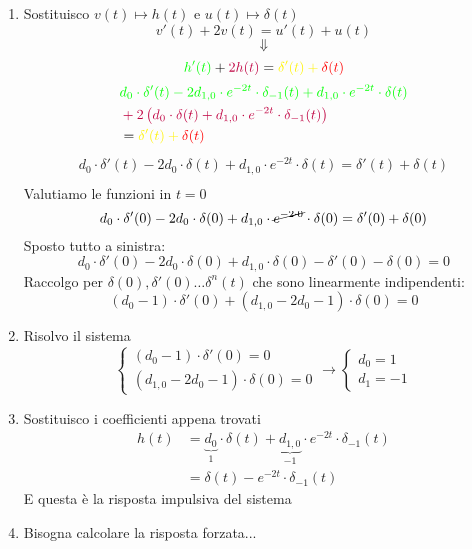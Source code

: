\documentclass[a4paper]{article}
\begin{document}
\begin{example}
\begin{enumerate}
    \item Sostituisco \( v(t) \mapsto h(t) \) e \( u(t) \mapsto \delta(t) \) 
      \[
      v'(t) + 2v(t) = u'(t) + u(t)
      \] 
      \[
      \Downarrow
      \] 
      \[
        \color{green}h'(t) \color{black}+ \color{purple}2h(t) \color{black}= 
        \color{yellow}\delta'(t) + \color{red}\delta(t)
      \] 
      \[
        \begin{aligned}
          &\color{green}d_0 \cdot \delta'(t) - 2d_{1,0} \cdot e^{-2t} \cdot \delta_{-1}(t) + d_{1,0}
          \cdot e^{-2t} \cdot \delta(t) \\
          &\color{purple}+ 2 \left( d_0 \cdot \delta(t) + d_{1,0} \cdot
          e^{-2t} \cdot \delta_{-1}(t) \right)\\
          &= \color{yellow}\delta'(t) + \color{red}\delta(t)
        \end{aligned}
      \] 
      \[
      \begin{aligned}
        d_0 \cdot \delta'(t) - 2d_0 \cdot  \delta(t) + d_{1,0} \cdot e^{-2t} \cdot
        \delta(t) = \delta'(t) + \delta(t)\\
      \end{aligned}
      \] 
      Valutiamo le funzioni in \( t=0 \) 
      \[
        d_0 \cdot \delta'(0) - 2d_0 \cdot  \delta(0) + d_{1,0} \cdot \cancel{e^{-2 \cdot 0}}
        \cdot \delta(0) = \delta'(0) + \delta(0)
      \] 
      Sposto tutto a sinistra:
      \[
        d_0 \cdot \delta'(0) - 2d_0 \cdot \delta(0) + d_{1,0} \cdot \delta(0) - \delta'(0) -
        \delta(0) = 0
      \] 
      Raccolgo per \( \delta(0), \delta'(0)\ldots \delta^n(t) \) che sono linearmente
      indipendenti:
      \[
        \left( d_0 - 1 \right) \cdot \delta'(0) + \left( d_{1,0} - 2d_0 - 1 \right) \cdot
        \delta(0) = 0
      \] 

    \item Risolvo il sistema
      \[
      \begin{cases}
        \left( d_0 - 1 \right) \cdot \delta'(0) = 0\\
        \left( d_{1,0} - 2d_0 - 1 \right) \cdot \delta(0) = 0
      \end{cases}
      \to 
      \begin{cases}
        d_0 = 1\\
        d_1 = -1
      \end{cases}
      \] 

    \item Sostituisco i coefficienti appena trovati
      \[
        \begin{aligned}
          h(t) &= \underbrace{d_0}_{1} \cdot \delta(t) + \underbrace{d_{1,0}}_{-1}
          \cdot e^{-2t} \cdot \delta_{-1}(t)\\
               &= \delta(t) - e^{-2t} \cdot \delta_{-1}(t)
        \end{aligned}
      \] 
      E questa è la risposta impulsiva del sistema

    \item Bisogna calcolare la risposta forzata...
  \end{enumerate}
  \label{ex:risposta_impulsiva}
\end{example}
\end{document}
